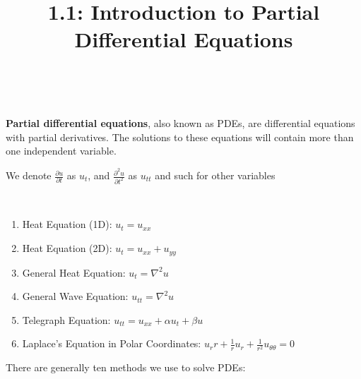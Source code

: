 \documentclass{article}
\title{1.1: Introduction to Partial Differential Equations}
\begin{document}
\maketitle
\ 
\begin{definition}
\textbf{Partial differential equations}, also known as PDEs, are differential equations with partial derivatives. The solutions to these equations will contain more than one independent variable.

We denote $\frac{\partial u}{\partial t}$ as $u_t$, and $\frac{\partial^2 u}{\partial t^2}$ as $u_{tt}$ and such for other variables    
\end{definition}

\begin{example}
    \ 
\begin{enumerate}
    \item Heat Equation (1D): $u_t = u_{xx}$
    \item Heat Equation (2D): $u_t = u_{xx} + u_{yy}$
    \item General Heat Equation: $u_t = \nabla^2 u$
    \item General Wave Equation: $u_{tt} = \nabla^2 u$
    \item Telegraph Equation: $u_{tt} = u_{xx} + \alpha u_t + \beta u$
    \item Laplace's Equation in Polar Coordinates: $u_rr + \frac{1}{r} u_r + \frac{1}{r^2} u_{\theta\theta} = 0$
\end{enumerate}
\end{example}

There are generally ten methods we use to solve PDEs:
\end{document}
